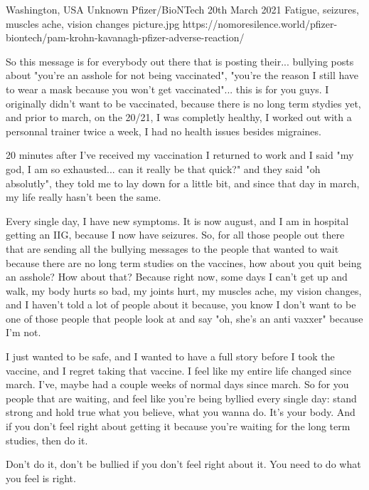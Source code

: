 {Washington, USA}
{Unknown}
{Pfizer/BioNTech}
{20th March 2021}
{Fatigue, seizures, muscles ache, vision changes}
{picture.jpg}
{https://nomoresilence.world/pfizer-biontech/pam-krohn-kavanagh-pfizer-adverse-reaction/}
{

So this message is for everybody out there that is posting their... bullying
posts about "you're an asshole for not being vaccinated", "you're the reason I
still have to wear a mask because you won't get vaccinated"... this is for you
guys.  I originally didn't want to be vaccinated, because there is no long term
stydies yet, and prior to march, on the 20/21, I was completly healthy, I worked
out with a personnal trainer twice a week, I had no health issues besides
migraines.

20 minutes after I've received my vaccination I returned to work and I said "my
god, I am so exhausted... can it really be that quick?" and they said "oh
absolutly", they told me to lay down for a little bit, and since that day in
march, my life really hasn't been the same.

Every single day, I have new symptoms. It is now august, and I am in hospital
getting an IIG, because I now have seizures. So, for all those people out there
that are sending all the bullying messages to the people that wanted to wait
because there are no long term studies on the vaccines, how about you quit being
an asshole? How about that? Because right now, some days I can't get up and
walk, my body hurts so bad, my joints hurt, my muscles ache, my vision changes,
and I haven't told a lot of people about it because, you know I don't want to be
one of those people that people look at and say "oh, she's an anti vaxxer"
because I'm not.

I just wanted to be safe, and I wanted to have a full story before I took the
vaccine, and I regret taking that vaccine.  I feel like my entire life changed
since march. I've, maybe had a couple weeks of normal days since march. So for
you people that are waiting, and feel like you're being byllied every single
day: stand strong and hold true what you believe, what you wanna do. It's your
body. And if you don't feel right about getting it because you're waiting for
the long term studies, then do it.

Don't do it, don't be bullied if you don't feel right about it. You need to do
what you feel is right.

}
